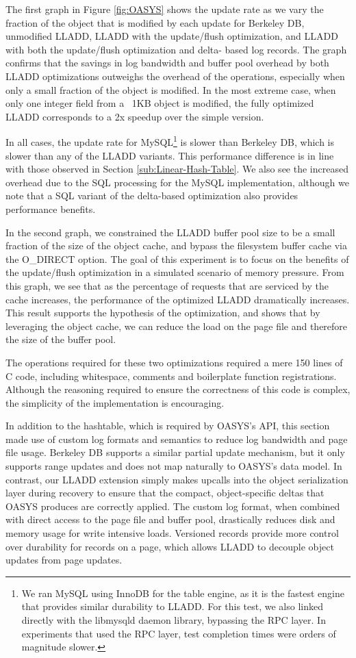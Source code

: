 \documentclass[10pt,letterpaper,twocolumn,english]{article}
\newcommand{\yad}{LLADD\xspace}
\newcommand{\oasys}{OASYS\xspace}
\begin{document}
The first graph in Figure \ref{fig:OASYS} shows the update rate as we
vary the fraction of the object that is modified by each update for
Berkeley DB, unmodified \yad, \yad with the update/flush optimization,
and \yad with both the update/flush optimization and delta- based log
records.
The graph confirms that the savings in log bandwidth and
buffer pool overhead by both \yad optimizations 
outweighs the overhead of the operations, especially when only a small
fraction of the object is modified.
In the most extreme case, when
only one integer field from a ~1KB object is modified, the fully
optimized \yad corresponds to a 2x speedup over the simple version.

In all cases, the update rate for MySQL\footnote{We ran MySQL using
InnoDB for the table engine, as it is the fastest engine that provides
similar durability to \yad. For this test, we also linked directly
with the libmysqld daemon library, bypassing the RPC layer. In
experiments that used the RPC layer, test completion times were orders
of magnitude slower.} is slower than Berkeley DB,
which is slower than any of the \yad variants. This performance
difference is in line with those observed in Section
\ref{sub:Linear-Hash-Table}. We also see the increased overhead due to
the SQL processing for the MySQL implementation, although we note that
a SQL variant of the delta-based optimization also provides performance
benefits.

In the second graph, we constrained the \yad buffer pool size to be a
small fraction of the size of the object cache, and bypass the filesystem
buffer cache via the O\_DIRECT option. The goal of this experiment is to
focus on the benefits of the update/flush optimization in a simulated
scenario of memory pressure. From this graph, we see that as the percentage of
requests that are serviced by the cache increases, the
performance of the optimized \yad dramatically increases.
This result supports the hypothesis of the optimization, and
shows that by leveraging the object cache, we can reduce the load on
the page file and therefore the size of the buffer pool.

The operations required for these
two optimizations required a mere 150 lines of C code, including
whitespace, comments and boilerplate function registrations.  Although
the reasoning required to ensure the correctness of this code is
complex, the simplicity of the implementation is encouraging.

In addition to the hashtable, which is required by \oasys's API, this
section made use of custom log formats and semantics to reduce log
bandwidth and page file usage.  Berkeley DB supports a similar
partial update mechanism, but it only
supports range updates and does not map naturally to \oasys's data
model.  In contrast, our \yad extension simply makes upcalls
into the object serialization layer during recovery to ensure that the
compact, object-specific deltas that \oasys produces are correctly
applied.  The custom log format, when combined with direct access to
the page file and buffer pool, drastically reduces disk and memory usage
for write intensive loads.
Versioned records provide more control over durability for
records on a page, which allows \yad to decouple object updates from page
updates.
\end{document}

